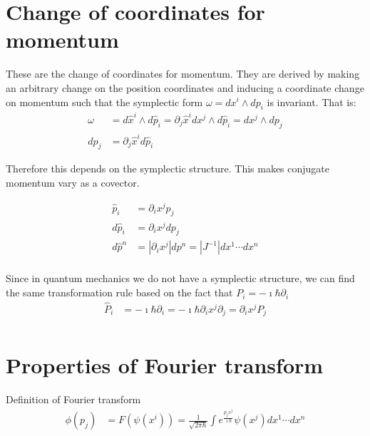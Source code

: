 \documentclass[11pt]{article}
\begin{document}
\section{Change of coordinates for momentum}

These are the change of coordinates for momentum. They are derived by making an arbitrary change on the position coordinates and inducing a coordinate change on momentum such that the symplectic form $\omega = dx^i \wedge dp_i$ is invariant. That is:
\begin{equation}
	\begin{aligned}
		\omega &= d\hat{x}^i \wedge d\hat{p}_i = \partial_j \hat{x}^i dx^j \wedge d\hat{p}_i = dx^j \wedge dp_j \\ 
		d p_j &= \partial_j \hat{x}^i d\hat{p}_i
	\end{aligned}
\end{equation}

Therefore this depends on the symplectic structure. This makes conjugate momentum vary as a covector.

\begin{equation}
	\begin{aligned}
		\hat{p}_i &= \partial_i x^j p_j \\
		d \hat{p}_i &= \partial_i x^j d p_j \\
		d\hat{p}^n &= | \partial_i x^j | dp^n = |J^{-1}| dx^1 \cdots dx^n \\
	\end{aligned}
\end{equation}

Since in quantum mechanics we do not have a symplectic structure, we can find the same transformation rule based on the fact that $P_i = -\imath \hbar \partial_i$
\begin{equation}
	\begin{aligned}
		\hat{P}_i &= -\imath \hbar \partial_i = -\imath \hbar \partial_i x^j \partial_j = \partial_i x^j P_j \\
	\end{aligned}
\end{equation}

\section{Properties of Fourier transform}

Definition of Fourier transform
\begin{equation}
	\begin{aligned}
		\phi(p_j) &= F(\psi(x^i)) = \frac{1}{\sqrt{2 \pi \hbar}} \int e^{\frac{p_j x^j}{\imath \hbar}} \psi(x^j) dx^1 \cdots dx^n \\
	\end{aligned}
\end{equation}
\end{document}
